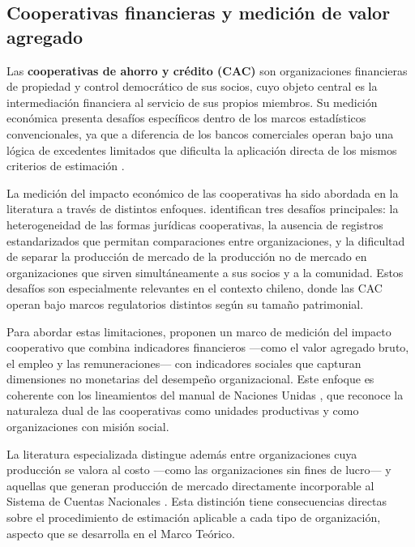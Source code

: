 \subsection{Cooperativas financieras y medición de valor agregado}

Las \textbf{cooperativas de ahorro y crédito (CAC)} son organizaciones financieras
de propiedad y control democrático de sus socios, cuyo objeto central es la
intermediación financiera al servicio de sus propios miembros. Su medición económica
presenta desafíos específicos dentro de los marcos estadísticos convencionales, ya
que a diferencia de los bancos comerciales operan bajo una lógica de excedentes
limitados que dificulta la aplicación directa de los mismos criterios de estimación
.

La medición del impacto económico de las cooperativas ha sido abordada en la
literatura a través de distintos enfoques. \cite{uzea_challenges_2015} identifican
tres desafíos principales: la heterogeneidad de las formas jurídicas cooperativas,
la ausencia de registros estandarizados que permitan comparaciones entre
organizaciones, y la dificultad de separar la producción de mercado de la producción
no de mercado en organizaciones que sirven simultáneamente a sus socios y a la
comunidad. Estos desafíos son especialmente relevantes en el contexto chileno, donde
las CAC operan bajo marcos regulatorios distintos según su tamaño patrimonial.

Para abordar estas limitaciones,  proponen un marco
de medición del impacto cooperativo que combina indicadores financieros ---como el
valor agregado bruto, el empleo y las remuneraciones--- con indicadores sociales que
capturan dimensiones no monetarias del desempeño organizacional. Este enfoque es
coherente con los lineamientos del manual de Naciones Unidas
\cite{vereinte_nationen_satellite_2018}, que reconoce la naturaleza dual de las
cooperativas como unidades productivas y como organizaciones con misión social.

La literatura especializada distingue además entre organizaciones cuya producción se
valora al costo ---como las organizaciones sin fines de lucro--- y aquellas que
generan producción de mercado directamente incorporable al Sistema de Cuentas
Nacionales . Esta distinción tiene
consecuencias directas sobre el procedimiento de estimación aplicable a cada tipo de
organización, aspecto que se desarrolla en el Marco Teórico.


